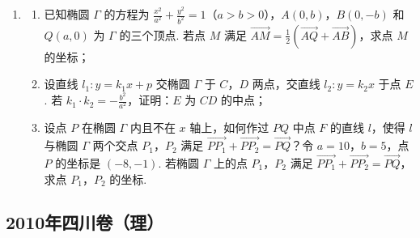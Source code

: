 \begin{description}
\begin{enumerate}[leftmargin=5pt]
        \item \begin{enumerate}
\item 已知椭圆 \(\Gamma\) 的方程为 \(\frac{x^2}{a^2} + \frac{y^2}{b^2} = 1\)（\(a > b > 0\)），\(A(0, b)\)，\(B(0, -b)\) 和 \(Q(a, 0)\) 为 \(\Gamma\) 的三个顶点. 若点 \(M\) 满足 \(\overrightarrow{AM} = \frac{1}{2}\left(\overrightarrow{AQ} + \overrightarrow{AB}\right)\)，求点 \(M\) 的坐标；
\item 设直线 \(l_{1}: y = k_{1}x + p\) 交椭圆 \(\Gamma\) 于 \(C\)，\(D\) 两点，交直线 \(l_{2}: y = k_{2}x\) 于点 \(E\). 若 \(k_{1} \cdot k_{2} = -\frac{b^{2}}{a^{2}}\)，证明：\(E\) 为 \(CD\) 的中点；
\item 设点 \(P\) 在椭圆 \(\Gamma\) 内且不在 \(x\) 轴上，如何作过 \(PQ\) 中点 \(F\) 的直线 \(l\)，使得 \(l\) 与椭圆 \(\Gamma\) 两个交点 \(P_{1}\)，\(P_{2}\) 满足 \(\overrightarrow{PP_{1}} + \overrightarrow{PP_{2}} = \overrightarrow{PQ}\)？令 \(a = 10\)，\(b = 5\)，点 \(P\) 的坐标是 \((-8, -1)\). 若椭圆 \(\Gamma\) 上的点 \(P_{1}\)，\(P_{2}\) 满足 \(\overrightarrow{PP_{1}} + \overrightarrow{PP_{2}} = \overrightarrow{PQ}\)，求点 \(P_{1}\)，\(P_{2}\) 的坐标.
\end{enumerate}

    \end{enumerate}

\end{description}


\subsection{2010年四川卷（理）}\label{gk:2010年四川卷（理）}

